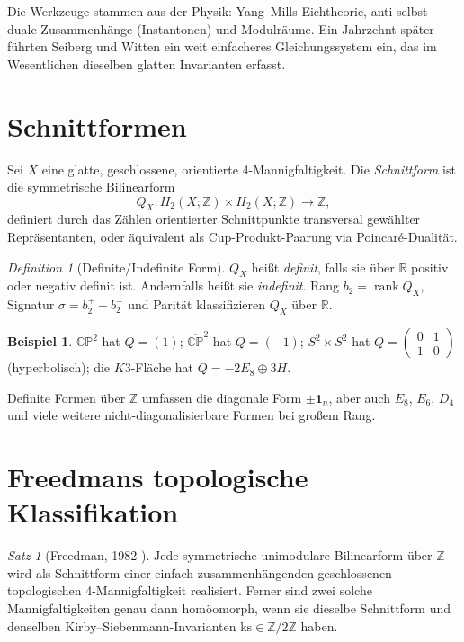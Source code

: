 \documentclass[12pt,a4paper]{amsart}
\theoremstyle{definition}
\newtheorem{example}[theorem]{Beispiel}
\theoremstyle{remark}
\newtheorem{satz}[theorem]{Satz}
\newtheorem{definition_de}[theorem]{Definition}
\DeclareMathOperator{\rank}{rank}
\newcommand{\CP}{\mathbb{CP}}
\newcommand{\ZZ}{\mathbb{Z}}
\newcommand{\RR}{\mathbb{R}}
\begin{document}
Die Werkzeuge stammen aus der Physik: Yang--Mills-Eichtheorie, anti-selbst-duale
Zusammenhänge (Instantonen) und Modulräume.  Ein Jahrzehnt später führten
Seiberg und Witten \cite{SeibergWitten1994} ein weit einfacheres
Gleichungssystem ein, das im Wesentlichen dieselben glatten Invarianten erfasst.

\section{Schnittformen}

Sei $X$ eine glatte, geschlossene, orientierte 4-Mannigfaltigkeit.
Die \emph{Schnittform} ist die symmetrische Bilinearform
\[
  Q_X \colon H_2(X;\ZZ) \times H_2(X;\ZZ) \longrightarrow \ZZ,
\]
definiert durch das Zählen orientierter Schnittpunkte transversal gewählter
Repräsentanten, oder äquivalent als Cup-Produkt-Paarung via Poincaré-Dualität.

\begin{definition_de}[Definite/Indefinite Form]
$Q_X$ heißt \emph{definit}, falls sie über $\RR$ positiv oder negativ definit
ist.  Andernfalls heißt sie \emph{indefinit}.  Rang $b_2 = \rank Q_X$,
Signatur $\sigma = b_2^+ - b_2^-$ und Parität klassifizieren $Q_X$ über $\RR$.
\end{definition_de}

\begin{example}
$\CP^2$ hat $Q = (1)$; $\overline{\CP}^2$ hat $Q = (-1)$;
$S^2 \times S^2$ hat $Q = \begin{pmatrix}0&1\\1&0\end{pmatrix}$ (hyperbolisch);
die $K3$-Fläche hat $Q = -2E_8 \oplus 3H$.
\end{example}

Definite Formen über $\ZZ$ umfassen die diagonale Form $\pm\mathbf{1}_n$,
aber auch $E_8$, $E_6$, $D_4$ und viele weitere nicht-diagonalisierbare
Formen bei großem Rang.

\section{Freedmans topologische Klassifikation}

\begin{satz}[Freedman, 1982 \cite{Freedman1982}]
Jede symmetrische unimodulare Bilinearform über $\ZZ$ wird als Schnittform
einer einfach zusammenhängenden geschlossenen topologischen 4-Mannigfaltigkeit
realisiert.  Ferner sind zwei solche Mannigfaltigkeiten genau dann
homöomorph, wenn sie dieselbe Schnittform und denselben
Kirby--Siebenmann-Invarianten $\mathrm{ks} \in \ZZ/2\ZZ$ haben.
\end{satz}
\end{document}
